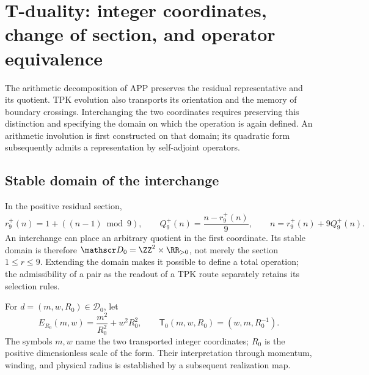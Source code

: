\section{T-duality: integer coordinates, change of section, and operator equivalence}
\label{x_reciprocidad:iv:dualidad}

The arithmetic decomposition of APP preserves the residual representative
and its quotient. TPK evolution also transports its orientation and
the memory of boundary crossings. Interchanging the two
coordinates requires preserving this distinction and specifying the domain
on which the operation is again defined. An arithmetic involution is
first constructed on that domain; its quadratic form
subsequently admits a representation by self-adjoint operators.

\subsection{Stable domain of the interchange}

In the positive residual section,
\begin{equation}
 r_9^+(n)=1+((n-1)\bmod9),\qquad
 Q_9^+(n)=\frac{n-r_9^+(n)}9,
 \qquad n=r_9^+(n)+9Q_9^+(n).
 \label{x_reciprocidad:iv:eq:division-positiva}
\end{equation}
An interchange can place an arbitrary quotient in the first
coordinate. Its stable domain is therefore
\(\mathscr D_0=\ZZ^2\times\RR_{>0}\), not merely the section
\(1\leq r\leq9\). Extending the domain makes it possible to define
a total operation; the admissibility of a pair as the readout of
a TPK route separately retains its selection rules.

\begin{definition}
\label{x_reciprocidad:iv:def:dualidad}
For \(d=(m,w,R_0)\in\mathscr D_0\), let
\begin{equation}
 E_{R_0}(m,w)=\frac{m^2}{R_0^2}+w^2R_0^2,
 \qquad
 \mathsf T_0(m,w,R_0)=(w,m,R_0^{-1}).
 \label{x_reciprocidad:iv:eq:energia-t}
\end{equation}
The symbols \(m,w\) name the two transported integer
coordinates; \(R_0\) is the positive dimensionless scale of
the form. Their interpretation through momentum, winding, and
physical radius is established by a subsequent realization map.
\end{definition}

